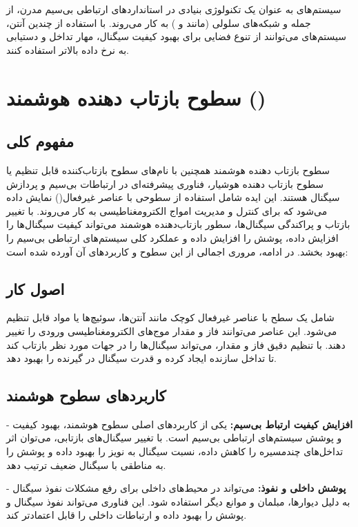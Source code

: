 سیستم‌های  به عنوان یک تکنولوژی بنیادی در استانداردهای ارتباطی بی‌سیم مدرن، از جمله  و شبکه‌های سلولی (مانند  و ) به کار می‌روند. با استفاده از چندین آنتن، سیستم‌های  می‌توانند از تنوع فضایی برای بهبود کیفیت سیگنال، مهار تداخل و دستیابی به نرخ داده بالاتر استفاده کنند.
\section{
	سطوح بازتاب دهنده هوشمند ()
}

\subsection{
	مفهوم کلی
}

سطوح بازتاب دهنده هوشمند همچنین با نام‌های سطوح بازتاب‌کننده قابل تنظیم یا سطوح بازتاب دهنده هوشیار، فناوری پیشرفته‌ای در ارتباطات بی‌سیم و پردازش سیگنال هستند. این ایده شامل استفاده از سطوحی با عناصر غیرفعال() نمایش داده می‌شود که برای کنترل و مدیریت امواج الکترومغناطیسی به کار می‌روند. با تغییر بازتاب و پراکندگی سیگنال‌ها، سطور بازتاب‌دهنده هوشمند می‌تواند کیفیت سیگنال‌ها را افزایش داده، پوشش را افزایش داده و عملکرد کلی سیستم‌های ارتباطی بی‌سیم را بهبود بخشد. در ادامه، مروری اجمالی از این سطوح و کاربردهای آن آورده شده است:

\subsection{
	اصول کار
}

 شامل یک سطح با عناصر غیرفعال کوچک مانند آنتن‌ها، سوئیچ‌ها یا مواد قابل تنظیم می‌شود. این عناصر می‌توانند فاز و مقدار موج‌های الکترومغناطیسی ورودی را تغییر دهند. با تنظیم دقیق فاز و مقدار،  می‌تواند سیگنال‌ها را در جهات مورد نظر بازتاب کند تا تداخل سازنده ایجاد کرده و قدرت سیگنال در گیرنده را بهبود دهد.

\subsection{کاربردهای سطوح هوشمند}

- \textbf{
	افزایش کیفیت ارتباط بی‌سیم:
}
 یکی از کاربردهای اصلی سطوح هوشمند، بهبود کیفیت و پوشش سیستم‌های ارتباطی بی‌سیم است. با تغییر سیگنال‌های بازتابی، می‌توان اثر تداخل‌های چندمسیره را کاهش داده، نسبت سیگنال به نویز را بهبود داده و پوشش را به مناطقی با سیگنال ضعیف ترتیب دهد.

- \textbf{
	پوشش داخلی و نفوذ:
}
  می‌تواند در محیط‌های داخلی برای رفع مشکلات نفوذ سیگنال به دلیل دیوارها، مبلمان و موانع دیگر استفاده شود. این فناوری می‌تواند نفوذ سیگنال و پوشش را بهبود داده و ارتباطات داخلی را قابل اعتماد‌تر کند.

